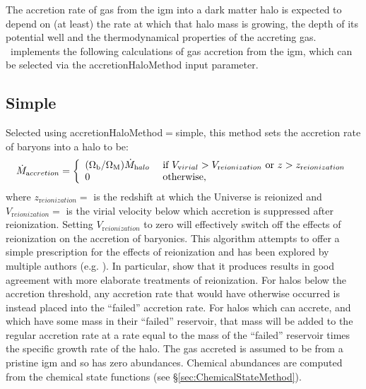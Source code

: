 The accretion rate of gas from the \gls{igm} into a dark matter halo is expected to depend on (at least) the rate at which that halo mass is growing, the depth of its potential well and the thermodynamical properties of the accreting gas. \glc\ implements the following calculations of gas accretion from the \gls{igm}, which can be selected via the {\normalfont \ttfamily accretionHaloMethod} input parameter.

\subsection{Simple}\label{phys:accretionHalo:accretionHaloSimple}

Selected using {\normalfont \ttfamily accretionHaloMethod}$=${\normalfont \ttfamily simple}, this method sets the accretion rate of baryons into a halo to be:
\begin{equation}
 \dot{M}_{\mathrm accretion} = \left\{ \begin{array}{ll} (\Omega_{\mathrm b}/\Omega_{\mathrm M}) \dot{M}_{\mathrm halo} & \hbox{ if } V_{\mathrm virial} > V_{\mathrm reionization} \hbox{ or } z > z_{\mathrm reionization} \\ 0 & \hbox{ otherwise,}\end{array} \right.
\label{eq:accretionHalo:truncation}
\end{equation}
where $z_{\mathrm reionization}=${\normalfont \ttfamily [reionizationSuppressionRedshift]} is the redshift at which the Universe is reionized and $V_{\mathrm reionization}=${\normalfont \ttfamily [reionizationSuppressionVelocity]} is the virial velocity below which accretion is suppressed after reionization. Setting $V_{\mathrm reionization}$ to zero will effectively switch off the effects of reionization on the accretion of baryonics. This algorithm attempts to offer a simple prescription for the effects of reionization and has been explored by multiple authors (e.g. \citealt{benson_effects_2002}). In particular, \cite{font_modelingmilky_2010} show that it produces results in good agreement with more elaborate treatments of reionization. For halos below the accretion threshold, any accretion rate that would have otherwise occurred is instead placed into the ``failed'' accretion rate. For halos which can accrete, and which have some mass in their ``failed'' reservoir, that mass will be added to the regular accretion rate at a rate equal to the mass of the 
``failed'' reservoir times the specific growth rate of the halo. The gas accreted is assumed to be from a pristine \gls{igm} and so has zero abundances. Chemical abundances are computed from the chemical state functions (see \S\ref{sec:ChemicalStateMethod}).

